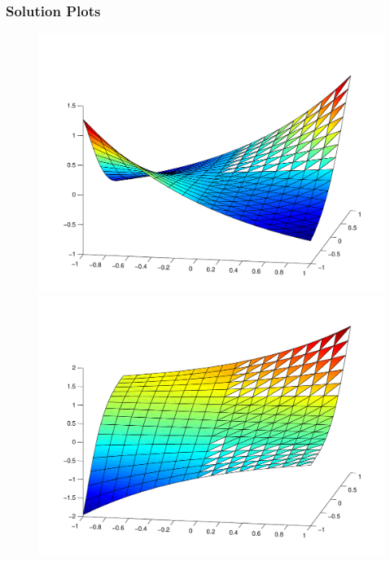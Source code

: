 \pagebreak

\subsubsection{Solution Plots}

\begin{figure}[h!b!h!]
\begin{center}
\includegraphics[height=0.27\textheight]{plots/poissonHybrid/phicubic16x16.pdf}\\
\includegraphics[height=0.27\textheight]{plots/poissonHybrid/psi1cubic16x16.pdf}\\

\end{center}
\end{figure}
